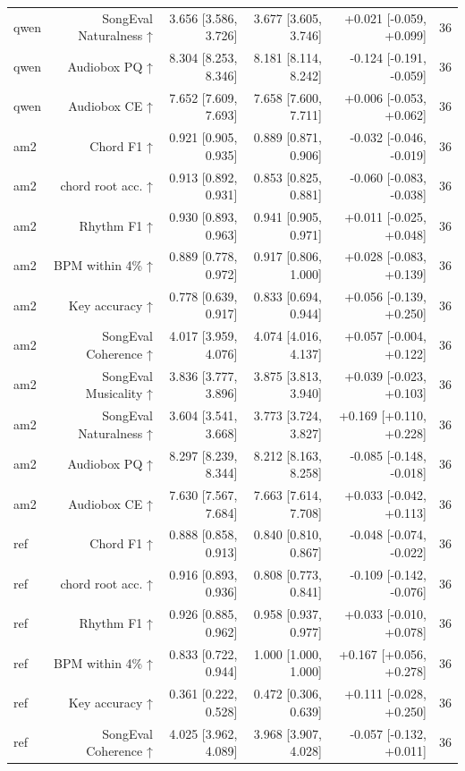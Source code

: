 \begin{table}[t]
\begin{tabular}{lrrrrr}
qwen & SongEval Naturalness ↑ & 3.656 [3.586, 3.726] & 3.677 [3.605, 3.746] & +0.021 [-0.059, +0.099] & 36 \\
qwen & Audiobox PQ ↑ & 8.304 [8.253, 8.346] & 8.181 [8.114, 8.242] & -0.124 [-0.191, -0.059] & 36 \\
qwen & Audiobox CE ↑ & 7.652 [7.609, 7.693] & 7.658 [7.600, 7.711] & +0.006 [-0.053, +0.062] & 36 \\
am2 & Chord F1 ↑ & 0.921 [0.905, 0.935] & 0.889 [0.871, 0.906] & -0.032 [-0.046, -0.019] & 36 \\
am2 & chord root acc. ↑ & 0.913 [0.892, 0.931] & 0.853 [0.825, 0.881] & -0.060 [-0.083, -0.038] & 36 \\
am2 & Rhythm F1 ↑ & 0.930 [0.893, 0.963] & 0.941 [0.905, 0.971] & +0.011 [-0.025, +0.048] & 36 \\
am2 & BPM within 4\% ↑ & 0.889 [0.778, 0.972] & 0.917 [0.806, 1.000] & +0.028 [-0.083, +0.139] & 36 \\
am2 & Key accuracy ↑ & 0.778 [0.639, 0.917] & 0.833 [0.694, 0.944] & +0.056 [-0.139, +0.250] & 36 \\
am2 & SongEval Coherence ↑ & 4.017 [3.959, 4.076] & 4.074 [4.016, 4.137] & +0.057 [-0.004, +0.122] & 36 \\
am2 & SongEval Musicality ↑ & 3.836 [3.777, 3.896] & 3.875 [3.813, 3.940] & +0.039 [-0.023, +0.103] & 36 \\
am2 & SongEval Naturalness ↑ & 3.604 [3.541, 3.668] & 3.773 [3.724, 3.827] & +0.169 [+0.110, +0.228] & 36 \\
am2 & Audiobox PQ ↑ & 8.297 [8.239, 8.344] & 8.212 [8.163, 8.258] & -0.085 [-0.148, -0.018] & 36 \\
am2 & Audiobox CE ↑ & 7.630 [7.567, 7.684] & 7.663 [7.614, 7.708] & +0.033 [-0.042, +0.113] & 36 \\
ref & Chord F1 ↑ & 0.888 [0.858, 0.913] & 0.840 [0.810, 0.867] & -0.048 [-0.074, -0.022] & 36 \\
ref & chord root acc. ↑ & 0.916 [0.893, 0.936] & 0.808 [0.773, 0.841] & -0.109 [-0.142, -0.076] & 36 \\
ref & Rhythm F1 ↑ & 0.926 [0.885, 0.962] & 0.958 [0.937, 0.977] & +0.033 [-0.010, +0.078] & 36 \\
ref & BPM within 4\% ↑ & 0.833 [0.722, 0.944] & 1.000 [1.000, 1.000] & +0.167 [+0.056, +0.278] & 36 \\
ref & Key accuracy ↑ & 0.361 [0.222, 0.528] & 0.472 [0.306, 0.639] & +0.111 [-0.028, +0.250] & 36 \\
ref & SongEval Coherence ↑ & 4.025 [3.962, 4.089] & 3.968 [3.907, 4.028] & -0.057 [-0.132, +0.011] & 36 \\

\end{tabular}
\end{table}
